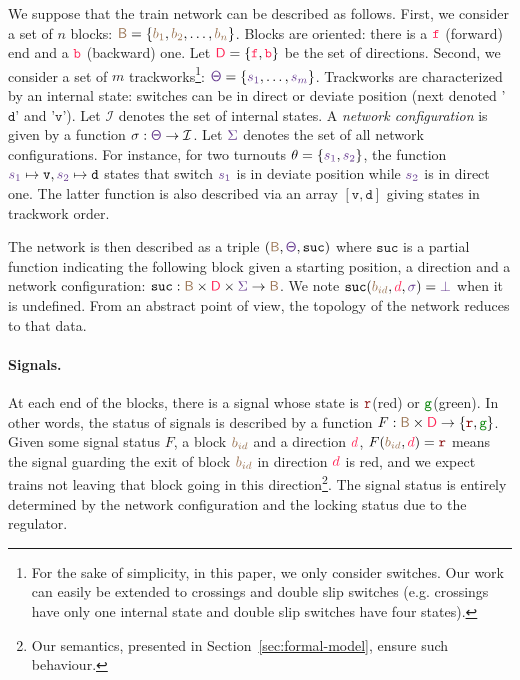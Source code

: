 \documentclass[runningheads]{llncs}
\newcommand{\directions}{\dirFmt{\mathsf{D}}}
\newcommand{\internalState}{{\mathcal{I}}}
\newcommand{\forward}{\ensuremath{\mathtt{f}}}
\newcommand{\backward}{\ensuremath{\mathtt{b}}\xspace}
\newcommand{\sucblock}{{\mathtt{suc}}}
\newcommand{\dirFmt}[1]{{\color{dircolor} #1}}
\newcommand{\dirForward}{\ensuremath{\dirFmt{\forward}}\xspace}
\newcommand{\dirBackward}{\ensuremath{\dirFmt{\backward}}\xspace}
\newcommand{\posFmt}[1]{{\color{poscolor}{#1}}}
\newcommand{\blocks}{{\posFmt{\mathsf{B}}}}
\newcommand{\bid}[1]{\ensuremath{\posFmt{b_{#1}}}}
\newcommand{\suc}[3]{\ensuremath{\sucblock(\posFmt{#1}, \dirFmt{#2}, \swFmt{#3})}}
\newcommand{\swFmt}[1]{{\color{swcolor}{#1}}}
\newcommand{\sid}[1]{\ensuremath{\swFmt{s_{#1}}}}
\newcommand{\turnouts}{\swFmt{\mathsf{\Theta}}}
\newcommand{\switches}{\ensuremath{\swFmt{\sigma}}}
\newcommand{\networkConf}{\ensuremath{\swFmt{\Sigma}}}
\newcommand{\nosuc}{\ensuremath{\swFmt{\bot}}}
\newcommand{\sigred}{{\mbox{${\color{red!50!black}\mathtt{r}}$}}\xspace}
\newcommand{\siggreen}{{\mbox{${\color{green!50!black}\mathtt{g}}$}}\xspace}
\newcommand{\deviate}{{\mbox{$\mathtt{v}$}}\xspace}
\newcommand{\direct}{{\mbox{$\mathtt{d}$}}\xspace}
\newcommand{\signalF}[2]{\ensuremath{\signals(\posFmt{#1}, \dirFmt{#2})}}
\newcommand{\signals}{\ensuremath{F}}
\begin{document}
We suppose that the train network can be described as follows. First, we consider a set of $n$ blocks: $\blocks = \{ \bid{1}, \bid{2}, \ldots, \bid{n}\}$. Blocks are oriented: there is a $\dirForward$ (forward) end and a $\dirBackward$ (backward) one. Let $\directions = \{\dirForward, \dirBackward\}$ be the set of directions.  Second, we consider a set of $m$ trackworks\footnote{For the sake of simplicity, in this paper, we only consider switches. Our work can easily be extended to crossings and double slip switches (e.g. crossings have only one internal state and double slip switches have four states).}: $\turnouts = \{\sid{1}, \ldots, \sid{m}\}$. Trackworks are characterized by an internal state: switches can be in direct or deviate position (next denoted '\direct' and '\deviate'). Let $\internalState$ denotes the set of internal states. A \emph{network configuration} is given by a function $\sigma: \turnouts \to \internalState$. Let $\networkConf$ denotes the set of all network configurations. For instance, for two turnouts $\theta = \{\sid{1}, \sid{2}\}$, the function $\sid{1} \mapsto \deviate, \sid{2} \mapsto \direct$ states that switch $\sid{1}$ is in deviate position while \sid{2} is in direct one. The latter function is also described via an array  $[\deviate, \direct]$ giving states in trackwork order.

The network is then described as a triple $(\blocks, \turnouts, \sucblock)$ where $\sucblock$ is a partial function indicating the following block given a starting position, a direction and a network configuration: $\sucblock: \blocks\times \directions \times \networkConf \to \blocks$. We note $\suc{\bid{id}}{d}{\switches} = \nosuc$ when it is undefined. From an abstract point of view, the topology of the network reduces to that data.  


\paragraph{Signals.}
At each end of the blocks, there is a signal whose state is \sigred (red) or \siggreen (green). In other words, the status of signals is described by a function $F: \blocks \times \directions \to \{ \sigred, \siggreen\}$. Given some signal status $F$, a block $\bid{id}$ and a direction $\dirFmt{d}$, $\signalF{\bid{id}}{d} = \sigred$ means the signal guarding the exit of block $\bid{id}$ in direction $\dirFmt{d}$ is red, and we expect trains not leaving that block going in this direction\footnote{Our semantics, presented in Section~\ref{sec:formal-model}, ensure such behaviour.}. The signal status is entirely determined by the network configuration and the locking status due to the regulator.
\end{document}
